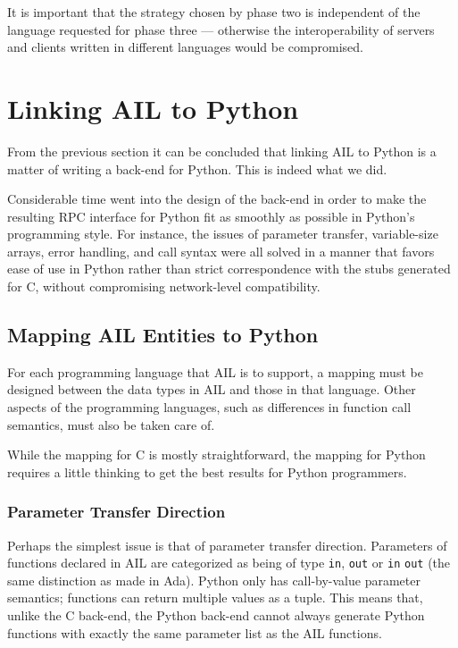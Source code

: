 It is important that the strategy chosen by phase two is independent
of the language requested for phase three --- otherwise the
interoperability of servers and clients written in different languages
would be compromised.

\section{Linking AIL to Python}

From the previous section it can be concluded that linking AIL to
Python is a matter of writing a back-end for Python.  This is indeed
what we did.

Considerable time went into the design of the back-end in order to
make the resulting RPC interface for Python fit as smoothly as
possible in Python's programming style.  For instance, the issues of
parameter transfer, variable-size arrays, error handling, and call
syntax were all solved in a manner that favors ease of use in Python
rather than strict correspondence with the stubs generated for C,
without compromising network-level compatibility.

\subsection{Mapping AIL Entities to Python}

For each programming language that AIL is to support, a mapping must
be designed between the data types in AIL and those in that language.
Other aspects of the programming languages, such as differences in
function call semantics, must also be taken care of.

While the mapping for C is mostly straightforward, the mapping for
Python requires a little thinking to get the best results for Python
programmers.

\subsubsection{Parameter Transfer Direction}

Perhaps the simplest issue is that of parameter transfer direction.
Parameters of functions declared in AIL are categorized as being of
type {\tt in}, {\tt out} or {\tt in} {\tt out} (the same distinction
as made in Ada).  Python only has call-by-value parameter semantics;
functions can return multiple values as a tuple.  This means that,
unlike the C back-end, the Python back-end cannot always generate
Python functions with exactly the same parameter list as the AIL
functions.

